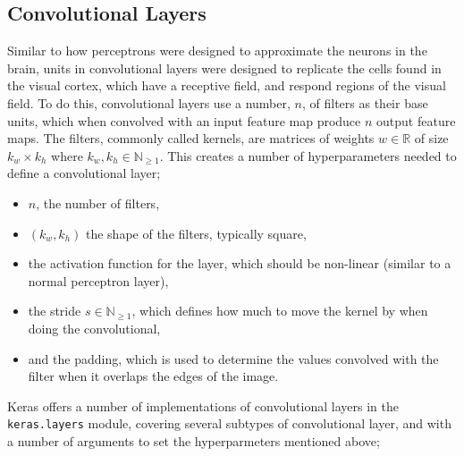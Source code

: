 \documentclass[12pt,a4paper,titlepage,twoside]{report}
\begin{document}
	\subsection{Convolutional Layers}
	Similar to how perceptrons were designed to approximate the neurons in the brain, units in convolutional layers were designed to replicate the cells found in the visual cortex, which have a receptive field, and respond regions of the visual field\cite{cnn-biology}. To do this, convolutional layers use a number, $n$, of filters as their base units, which when convolved with an input feature map produce $n$ output feature maps. The filters, commonly called kernels, are matrices of weights $w \in \mathbb{R}$ of size $k_w \times k_h$ where $k_w, k_h \in \mathbb{N}_{\geq1}$\cite{cnn-analysis}.
	This creates a number of hyperparameters needed to define a convolutional layer;
	\begin{itemize}
	\item $n$, the number of filters,
	\item $(k_w, k_h)$ the shape of the filters, typically square,
	\item the activation function for the layer, which should be non-linear (similar to a normal perceptron layer),
	\item the stride $s \in \mathbb{N}_{\geq1}$, which defines how much to move the kernel by when doing the convolutional,
	\item and the padding, which is used to determine the values convolved with the filter when it overlaps the edges of the image.
	\end{itemize}
	Keras offers a number of implementations of convolutional layers in the \texttt{keras.layers} module, covering several subtypes of convolutional layer, and with a number of arguments to set the hyperparmeters mentioned above;
\end{document}
